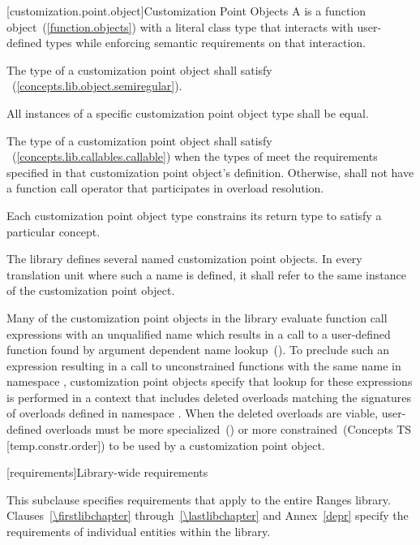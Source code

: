 \begin{addedblock}
[customization.point.object]{Customization Point Objects}
\pnum
A  is a function object~(\ref{function.objects}) with a
literal class type that interacts with user-defined types while
enforcing semantic requirements on that interaction.

\pnum
The type of a customization point object shall satisfy
~(\ref{concepts.lib.object.semiregular}).

\pnum
All instances of a specific customization point object type shall
be equal.

\pnum
The type of a customization point object  shall satisfy
~(\ref{concepts.lib.callables.callable}) when the types of
 meet the requirements specified in that
customization point object's definition. Otherwise, 
shall not have a function call operator that participates in
overload resolution.

\pnum
Each customization point object type constrains its return type
to satisfy a particular concept.

\pnum
The library defines several named customization point objects.
In every translation unit where such a name is defined, it shall
refer to the same instance of the customization point object.

\pnum
\enternote Many of the customization point objects in the library
evaluate function call expressions with an unqualified name which
results in a call to a user-defined function found by argument
dependent name lookup~(). To preclude
such an expression resulting in a call to unconstrained functions
with the same name in namespace , customization point
objects specify that lookup for these expressions is performed in
a context that includes deleted overloads matching the signatures
of overloads defined in namespace . When the deleted
overloads are viable, user-defined overloads must be more
specialized~() or more
constrained~(Concepts TS [temp.constr.order]) to be used by a
customization point object. \exitnote
\end{addedblock}

[requirements]{Library-wide requirements}

\pnum
This subclause specifies requirements that apply to the entire Ranges library.
Clauses~\ref{\firstlibchapter} through~\ref{\lastlibchapter} and Annex~\ref{depr}
specify the requirements of individual entities within the library.

